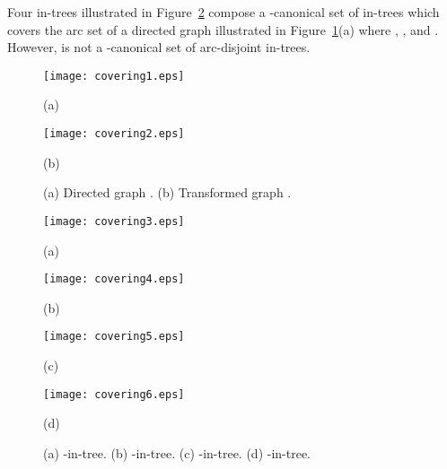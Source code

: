 \documentclass[11pt]{article}
\newcounter{ni}
\theoremstyle{plain}
\begin{document}
Four in-trees illustrated in Figure~\ref{fig:covering2}
compose a -canonical set  of in-trees which covers the arc set of a
directed graph   illustrated in Figure~\ref{fig:covering1}(a) where 
, ,  and . However,  
is not a -canonical set of arc-disjoint in-trees. 
\begin{figure}[h]
\begin{minipage}{0.5\hsize}
\begin{center}
\texttt{[image: covering1.eps]}
\par(a)
\end{center}
\end{minipage}
\begin{minipage}{0.5\hsize}
\begin{center}
\texttt{[image: covering2.eps]}
\par(b)
\end{center}
\end{minipage}
\caption{\small (a) Directed graph  . (b) Transformed graph .}
\label{fig:covering1}
\end{figure}
\begin{figure}[h]
\begin{minipage}{0.245\hsize}
\begin{center}
\texttt{[image: covering3.eps]}
\par(a)
\end{center}
\end{minipage}
\begin{minipage}{0.245\hsize}
\begin{center}
\texttt{[image: covering4.eps]}
\par(b)
\end{center}
\end{minipage}
\begin{minipage}{0.245\hsize}
\begin{center}
\texttt{[image: covering5.eps]}
\par(c)
\end{center}
\end{minipage}
\begin{minipage}{0.245\hsize}
\begin{center}
\texttt{[image: covering6.eps]}
\par(d)
\end{center}
\end{minipage}
\caption{\small (a) -in-tree. (b) -in-tree. (c) -in-tree. (d) -in-tree.}
\label{fig:covering2}
\end{figure}
\end{document}
